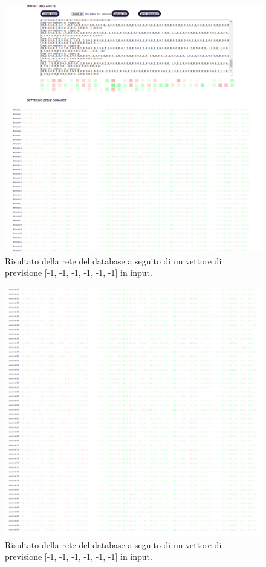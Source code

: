 \begin{figure}[H]
\centering
	\includegraphics[width=0.90\linewidth]{./image/rete_db-vpmeno1.png}
	\caption{Risultato della rete del database a seguito di un vettore di previsione [-1, -1, -1, -1, -1, -1] in input.}
\end{figure}

\begin{figure}[H]
\centering
	\includegraphics[width=0.90\linewidth]{./image/rete_db-vpmeno1_2.png}
	\caption{Risultato della rete del database a seguito di un vettore di previsione [-1, -1, -1, -1, -1, -1] in input.}
\end{figure}

